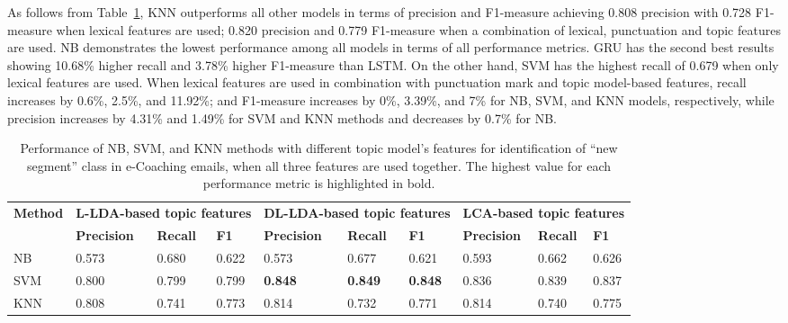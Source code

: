 \documentclass{amia}
\begin{document}
As follows from Table~\ref{tab:result_boundary}, KNN outperforms all other models in terms of precision and F1-measure achieving 0.808 precision with 0.728 F1-measure when lexical features are used; 0.820 precision and 0.779 F1-measure when a combination of lexical, punctuation and topic features are used. NB demonstrates the lowest performance among all models in terms of all performance metrics. GRU has the second best results showing 10.68\% higher recall and 3.78\%  higher F1-measure than LSTM. On the other hand, SVM has the highest recall of 0.679 when only lexical features are used. When lexical features are used in combination with punctuation mark and topic model-based features, recall increases by 0.6\%, 2.5\%, and 11.92\%; and F1-measure increases by 0\%, 3.39\%, and 7\% for NB, SVM, and KNN models, respectively, while precision increases by 4.31\% and 1.49\% for SVM and KNN methods and decreases by 0.7\% for NB. \\

\begin{table}[ht]
\centering
\caption{Performance of NB, SVM, and KNN methods with different topic model's features for identification of ``new segment'' class in e-Coaching emails, when all three features are used together. The highest value for each performance metric is highlighted in bold.}
\label{tab:result_boundary}
  \begin{tabular}{|l|l|l|l|l|l|l|l|l|l|}
  \hline
   \multirow{2}{*}{\textbf{Method}} & \multicolumn{3}{|c|}{\textbf{L-LDA-based topic features}} & \multicolumn{3}{|c|}{\textbf{DL-LDA-based topic features}}  & \multicolumn{3}{|c|}{\textbf{LCA-based topic features}} \\\cline{2-10} & \textbf{Precision}  & \textbf{Recall} & \textbf{F1} & \textbf{Precision}  & \textbf{Recall} & \textbf{F1} & \textbf{Precision}  & \textbf{Recall} & \textbf{F1}\\ \hline  
    
 NB & 0.573 & 0.680 & 0.622 & 0.573 & 0.677 & 0.621 & 0.593 & 0.662 & 0.626 \\ \hline
 SVM & 0.800 & 0.799 & 0.799 & \textbf{0.848} & \textbf{0.849} & \textbf{0.848} & 0.836 & 0.839 & 0.837  \\ \hline
 KNN & 0.808 & 0.741 & 0.773 & 0.814 & 0.732 & 0.771 & 0.814 & 0.740 & 0.775 \\ \hline
  \end{tabular}
\end{table}                 
\end{document}
